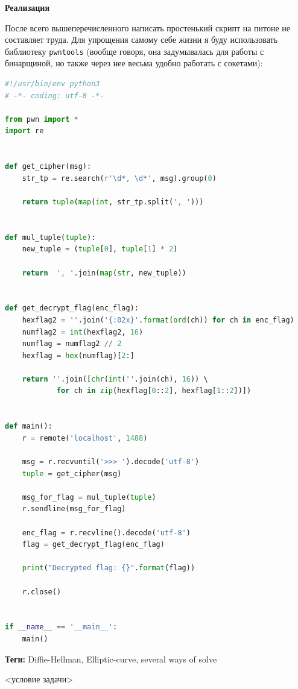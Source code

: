 \documentclass[idxtotoc,hyperref,openany,oneside]{files/crypto} %
\begin{document}
\textbf{Реализация}

После всего вышеперечисленного написать простенький скрипт на питоне не составляет труда. Для упрощения самому себе жизни я буду использовать библиотеку \verb|pwntools| (вообще говоря, она задумывалась для работы с бинарщиной, но также через нее весьма удобно работать с сокетами):
\begin{lstlisting}[language=Python, caption=Взлом криптосистемы Эль-Гамаля]
#!/usr/bin/env python3
# -*- coding: utf-8 -*-

from pwn import *
import re


def get_cipher(msg):
    str_tp = re.search(r'\d*, \d*', msg).group(0)

    return tuple(map(int, str_tp.split(', ')))


def mul_tuple(tuple):
    new_tuple = (tuple[0], tuple[1] * 2)

    return  ', '.join(map(str, new_tuple))


def get_decrypt_flag(enc_flag):
    hexflag2 = ''.join('{:02x}'.format(ord(ch)) for ch in enc_flag)
    numflag2 = int(hexflag2, 16)
    numflag = numflag2 // 2
    hexflag = hex(numflag)[2:]

    return ''.join([chr(int(''.join(ch), 16)) \ 
    		for ch in zip(hexflag[0::2], hexflag[1::2])])


def main():
    r = remote('localhost', 1488)

    msg = r.recvuntil('>>> ').decode('utf-8')
    tuple = get_cipher(msg)

    msg_for_flag = mul_tuple(tuple)
    r.sendline(msg_for_flag)

    enc_flag = r.recvline().decode('utf-8')
    flag = get_decrypt_flag(enc_flag)

    print("Decrypted flag: {}".format(flag))

    r.close()


if __name__ == '__main__':
    main()
\end{lstlisting}



\textbf{Теги:} Diffie-Hellman, Elliptic-curve, several ways of solve\vspace{\baselineskip}

\begin{tcolorbox}
<условие задачи>
\end{tcolorbox}



\end{document}
